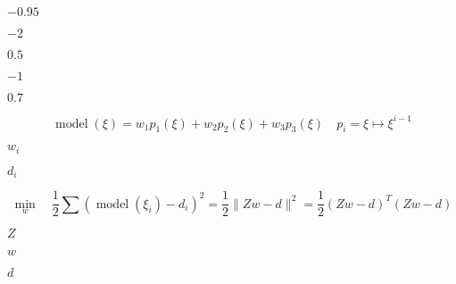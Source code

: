 \documentclass[10pt]{book}
\begin{document}
\begin{mdSnippets}
\begin{mdInlineSnippet}[98e74e9689db01915cc605dd3608bf83]
$-0.95$\end{mdInlineSnippet}%
\begin{mdInlineSnippet}[5d7b9adcbe1c629ec722529dd12e5129]%
$-2$\end{mdInlineSnippet}%
\begin{mdInlineSnippet}[d310cb367d993fb6fb584b198a2fd72c]%
$0.5$\end{mdInlineSnippet}%
\begin{mdInlineSnippet}[6bb61e3b7bce0931da574d19d1d82c88]%
$-1$\end{mdInlineSnippet}%
\begin{mdInlineSnippet}[91c85f899e56014969935fefd68830b9]%
$0.7$\end{mdInlineSnippet}%
\begin{mdDisplaySnippet}[5ef057d138f01992c0548d4f3a5a289d]%
\[%
 \operatorname{model}(\xi)=w_{1} p_{1}(\xi)+w_{2} p_{2}(\xi)+w_{3} p_{3}(\xi) \quad p_{i}=\xi \mapsto \xi^{i-1}
\]%
\end{mdDisplaySnippet}%
\begin{mdInlineSnippet}[aa38f107289d4d73d516190581397349]%
$w_i$\end{mdInlineSnippet}%
\begin{mdInlineSnippet}[d247f594c78d0d2be10fc6d82512cc4e]%
$d_i$\end{mdInlineSnippet}%
\begin{mdDisplaySnippet}%
\[%
 \min_{w} \quad \frac{1}{2} \sum\left(\operatorname{model}\left(\xi_{i}\right)-d_{i}\right)^{2}=\frac{1}{2}\|Z w-d\|^{2}=\frac{1}{2}(Z w-d)^T(Z w-d)
\]%
\end{mdDisplaySnippet}%
\begin{mdInlineSnippet}[21c2e59531c8710156d34a3c30ac81d5]%
$Z$\end{mdInlineSnippet}%
\begin{mdInlineSnippet}[f1290186a5d0b1ceab27f4e77c0c5d68]%
$w$\end{mdInlineSnippet}%
\begin{mdInlineSnippet}[8277e0910d750195b448797616e091ad]%
$d$\end{mdInlineSnippet}%
\begin{mdInlineSnippet}[f1290186a5d0b1ceab27f4e77c0c5d68]%

\end{mdInlineSnippet}
\end{mdSnippets}
\end{document}
